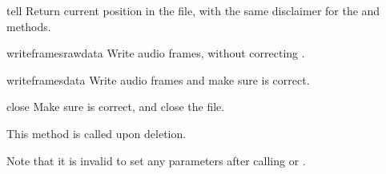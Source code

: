 \begin{methoddesc}[AU_write]{tell}{}
Return current position in the file, with the same disclaimer for
the  and  methods.
\end{methoddesc}

\begin{methoddesc}[AU_write]{writeframesraw}{data}
Write audio frames, without correcting .
\end{methoddesc}

\begin{methoddesc}[AU_write]{writeframes}{data}
Write audio frames and make sure  is correct.
\end{methoddesc}

\begin{methoddesc}[AU_write]{close}{}
Make sure  is correct, and close the file.

This method is called upon deletion.
\end{methoddesc}

Note that it is invalid to set any parameters after calling 
 or . 
